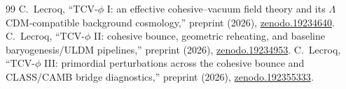 \documentclass[aps,prd,onecolumn,nofootinbib,superscriptaddress]{revtex4-2}
\begin{document}
\begin{thebibliography}{99}
 C.~Lecroq, ``TCV-$\phi$ I: an effective cohesive--vacuum field theory and its $\Lambda$CDM-compatible background cosmology,'' preprint (2026), \href{https://doi.org/10.5281/zenodo.19234640}{zenodo.19234640}.
 C.~Lecroq, ``TCV-$\phi$ II: cohesive bounce, geometric reheating, and baseline baryogenesis/ULDM pipelines,'' preprint (2026), \href{https://doi.org/10.5281/zenodo.19234953}{zenodo.19234953}.
 C.~Lecroq, ``TCV-$\phi$ III: primordial perturbations across the cohesive bounce and CLASS/CAMB bridge diagnostics,'' preprint (2026), \href{https://doi.org/10.5281/zenodo.192355333}{zenodo.192355333}.
\end{thebibliography}
\end{document}
